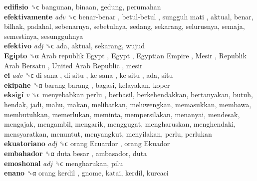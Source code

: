 \textbf{edifisio} ␝ϲ  bangunan, binaan, gedung, perumahan  \\
\textbf{efektivamente} \emph{adv}  ␝ϲ   benar-benar ,  betul-betul ,  sungguh mati , aktual, benar, bilhak, padahal, sebenarnya, sebetulnya, sedang, sekarang, selurusnya, semaja, semestinya, sesungguhnya  \\
\textbf{efektivo} \emph{adj}  ␝ϲ  ada, aktual, sekarang, wujud  \\
\textbf{Egipto} ␝α   Arab republik Egypt ,  Egypt ,  Egyptian Empire ,  Mesir ,  Republik Arab Bersatu ,  United Arab Republic , mesir  \\
\textbf{ei} \emph{adv}  ␝ϲ   di sana ,  di situ ,  ke sana ,  ke situ , ada, situ  \\
\textbf{ekipahe} ␝α   barang-barang , bagasi, kelayakan, koper  \\
\textbf{eksigí} \emph{v}  ␝ϲ   menyebabkan perlu , berhasil, berkehendakkan, bertanyakan, butuh, hendak, jadi, mahu, makan, melibatkan, meluwengkan, memasukkan, membawa, membutuhkan, memerlukan, meminta, mempersilakan, menanyai, mendesak, mengajak, mengambil, mengarik, menggugat, mengharuskan, menghendaki, mensyaratkan, menuntut, menyangkut, menyilakan, perlu, perlukan  \\
\textbf{ekuatoriano} \emph{adj}  ␝ϲ   orang Ecuardor ,  orang Ekuador   \\
\textbf{embahador} ␝α   duta besar , ambasador, duta  \\
\textbf{emoshonal} \emph{adj}  ␝ϲ  mengharukan, pilu  \\
\textbf{enano} ␝α   orang kerdil , gnome, katai, kerdil, kurcaci  \\
